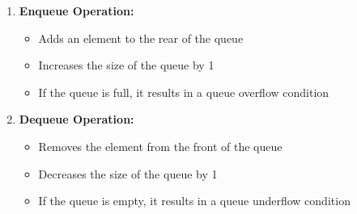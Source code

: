 \begin{enumerate}
\def\labelenumi{\arabic{enumi}.}
\tightlist
\item
  \textbf{Enqueue Operation:}

  \begin{itemize}
  \tightlist
  \item
    Adds an element to the rear of the queue
  \item
    Increases the size of the queue by 1
  \item
    If the queue is full, it results in a queue overflow condition
  \end{itemize}

\begin{Shaded}
\begin{Highlighting}[]
     \OperatorTok{\textless{}}
    \NormalTok{:}
        \NormalTok{(}\NormalTok{)}
\end{Highlighting}
\end{Shaded}
\item
  \textbf{Dequeue Operation:}

  \begin{itemize}
  \tightlist
  \item
    Removes the element from the front of the queue
  \item
    Decreases the size of the queue by 1
  \item
    If the queue is empty, it results in a queue underflow condition
  \end{itemize}

\begin{Shaded}
\begin{Highlighting}[]
     
        \NormalTok{)}
    \NormalTok{:}
        \NormalTok{(}\NormalTok{)}
         
\end{Highlighting}
\end{Shaded}
\end{enumerate}

\begin{Shaded}
\begin{Highlighting}[]
\end{Highlighting}
\end{Shaded}


